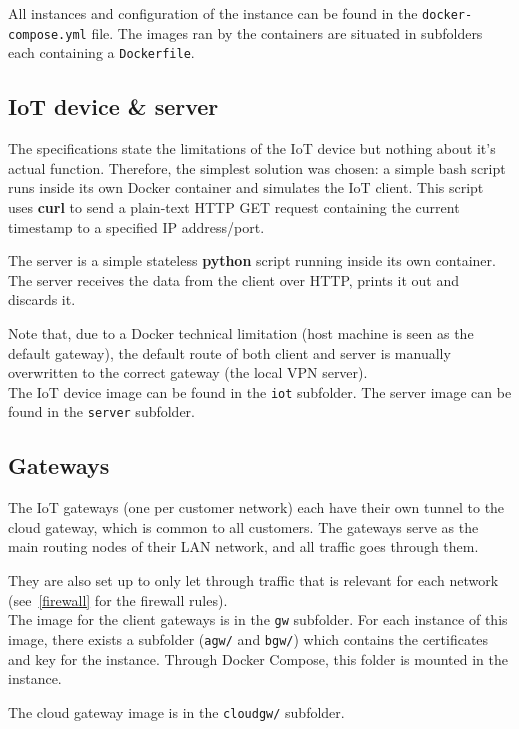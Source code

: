 \documentclass[paper=a4, fontsize=11pt]{scrartcl}
\begin{document}
All instances and configuration of the instance can be found in the
\texttt{docker-compose.yml} file.
The images ran by the containers are situated in subfolders each containing a
\texttt{Dockerfile}.

\subsection{IoT device \& server}

The specifications state the limitations of the IoT device but nothing about
it's actual function.
Therefore, the simplest solution was chosen: a simple bash script runs inside
its own Docker container and simulates the IoT client.
This script uses \textbf{curl} to send a plain-text HTTP GET request containing
the current timestamp to a specified IP address/port.

The server is a simple stateless \textbf{python} script running inside its
own container.
The server receives the data from the client over HTTP, prints it out and
discards it.

Note that, due to a Docker technical limitation (host machine is seen as the
default gateway), the default route of both client and server is manually
overwritten to the correct gateway (the local VPN server).
\\

The IoT device image can be found in the \texttt{iot} subfolder.
The server image can be found in the \texttt{server} subfolder.

\subsection{Gateways}

The IoT gateways (one per customer network) each have their own tunnel to the
cloud gateway, which is common to all customers.
The gateways serve as the main routing nodes of their LAN network, and all
traffic goes through them.

They are also set up to only let through traffic that is relevant for each
network (see~\autoref{firewall} for the firewall rules).
\\

The image for the client gateways is in the \texttt{gw} subfolder.
For each instance of this image, there exists a subfolder (\texttt{agw/} and
\texttt{bgw/}) which contains the certificates and key for the instance.
Through Docker Compose, this folder is mounted in the instance.

The cloud gateway image is in the \texttt{cloudgw/} subfolder.
\end{document}
